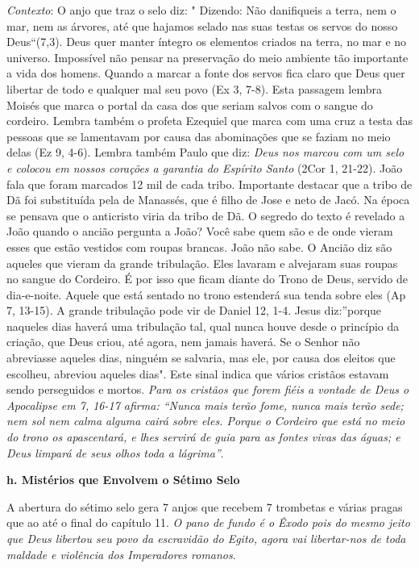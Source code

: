 \documentclass[
]{book}
\begin{document}
\emph{Contexto}: O anjo que traz o selo diz: " Dizendo: Não danifiqueis a terra, nem o mar, nem as árvores, até que hajamos selado nas suas testas os servos do nosso Deus``(7,3). Deus quer manter íntegro os elementos criados na terra, no mar e no universo. Impossível não pensar na preservação do meio ambiente tão importante a vida dos homens. Quando a marcar a fonte dos servos fica claro que Deus quer libertar de todo e qualquer mal seu povo (Ex 3, 7-8). Esta passagem lembra Moisés que marca o portal da casa dos que seriam salvos com o sangue do cordeiro. Lembra também o profeta Ezequiel que marca com uma cruz a testa das pessoas que se lamentavam por causa das abominações que se faziam no meio delas (Ez 9, 4-6). Lembra também Paulo que diz: \emph{Deus nos marcou com um selo e colocou em nossos corações a garantia do Espírito Santo} (2Cor 1, 21-22). João fala que foram marcados 12 mil de cada tribo. Importante destacar que a tribo de Dã foi substituída pela de Manassés, que é filho de Jose e neto de Jacó. Na época se pensava que o anticristo viria da tribo de Dã. O segredo do texto é revelado a João quando o ancião pergunta a João? Você sabe quem são e de onde vieram esses que estão vestidos com roupas brancas. João não sabe. O Ancião diz são aqueles que vieram da grande tribulação. Eles lavaram e alvejaram suas roupas no sangue do Cordeiro. É por isso que ficam diante do Trono de Deus, servido de dia-e-noite. Aquele que está sentado no trono estenderá sua tenda sobre eles (Ap 7, 13-15). A grande tribulação pode vir de Daniel 12, 1-4. Jesus diz:''porque naqueles dias haverá uma tribulação tal, qual nunca houve desde o princípio da criação, que Deus criou, até agora, nem jamais haverá. Se o Senhor não abreviasse aqueles dias, ninguém se salvaria, mas ele, por causa dos eleitos que escolheu, abreviou aqueles dias". Este sinal indica que vários cristãos estavam sendo perseguidos e mortos. \emph{Para os cristãos que forem fiéis a vontade de Deus o Apocalipse em 7, 16-17 afirma: ``Nunca mais terão fome, nunca mais terão sede; nem sol nem calma alguma cairá sobre eles. Porque o Cordeiro que está no meio do trono os apascentará, e lhes servirá de guia para as fontes vivas das águas; e Deus limpará de seus olhos toda a lágrima''}.

\textbf{h. Mistérios que Envolvem o Sétimo Selo}

A abertura do sétimo selo gera 7 anjos que recebem 7 trombetas e várias pragas que ao até o final do capítulo 11. \emph{O pano de fundo é o Êxodo pois do mesmo jeito que Deus libertou seu povo da escravidão do Egito, agora vai libertar-nos de toda maldade e violência dos Imperadores romanos}.
\end{document}
